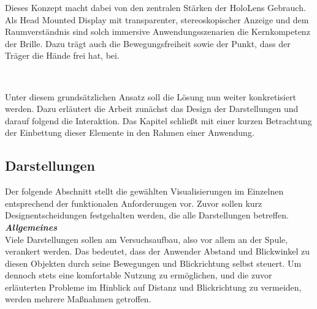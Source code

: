 Dieses Konzept macht dabei von den zentralen Stärken der HoloLens Gebrauch. Als Head Mounted Display mit transparenter, stereoskopischer Anzeige und dem Raumverständnis sind solch immersive Anwendungsszenarien die Kernkompetenz der Brille. Dazu trägt auch die Bewegungsfreiheit sowie der Punkt, dass der Träger die Hände frei hat, bei.

\begin{center}
	\\
\end{center}


Unter diesem grundsätzlichen Ansatz soll die Lösung nun weiter konkretisiert werden. Dazu erläutert die Arbeit zunächst das Design der Darstellungen und darauf folgend die Interaktion. Das Kapitel schließt mit einer kurzen Betrachtung der Einbettung dieser Elemente in den Rahmen einer Anwendung.

\subsection{Darstellungen}
Der folgende Abschnitt stellt die gewählten Visualisierungen im Einzelnen entsprechend der funktionalen Anforderungen vor. Zuvor sollen kurz Designentscheidungen festgehalten werden, die alle Darstellungen betreffen.\\

\textbf{\textit{Allgemeines}}\\
Viele Darstellungen sollen am Versuchsaufbau, also vor allem an der Spule, verankert werden. Das bedeutet, dass der Anwender Abstand und Blickwinkel zu diesen Objekten durch seine Bewegungen und Blickrichtung selbst steuert. Um dennoch stets eine komfortable Nutzung zu ermöglichen, und die zuvor erläuterten Probleme im Hinblick auf Distanz und Blickrichtung zu vermeiden, werden mehrere Maßnahmen getroffen.\\

